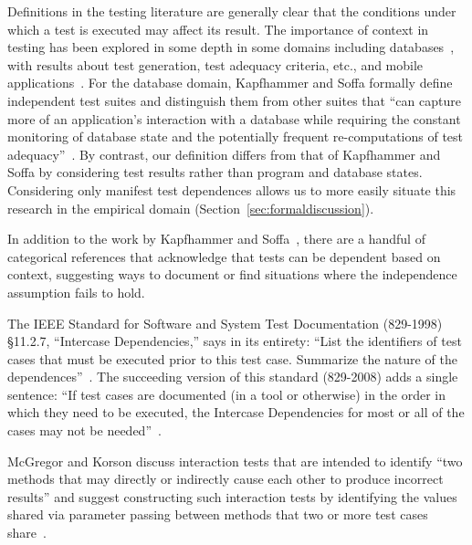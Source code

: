 Definitions in the testing literature are generally clear that the
conditions under which a test is executed may affect its result.  The
importance of context in testing has been explored in some depth in
some domains including databases~\cite{Gray:1994:QGB:191843.191886,Chays:2000:FTD:347324.348954,
kapfhammeretal:FSE:2003}, with results about test
generation, test adequacy criteria, etc., and mobile
applications~\cite{Wang:2007:AGC}.
For the database domain, Kapfhammer and Soffa formally
define independent test suites and distinguish them from
other suites that ``can capture more of an application's
interaction with a database while requiring the constant monitoring of
database state and the potentially frequent re-computations of test
adequacy''~\cite[p.~101]{kapfhammeretal:FSE:2003}.
By contrast, our definition differs from that of Kapfhammer
and Soffa by considering
test results rather than program and database states.
Considering only manifest test dependences allows
us to more easily situate this research in the empirical domain (Section~\ref{sec:formaldiscussion}).


In addition to the work by Kapfhammer and
Soffa~\cite{kapfhammeretal:FSE:2003},
there are a handful of categorical references that
acknowledge that tests can
be dependent based on context, suggesting 
ways to document or find situations where the independence
assumption fails to hold.  

The IEEE Standard for Software and System Test
Documentation (829-1998) \S 11.2.7, ``Intercase
Dependencies,'' says in its entirety: ``List the identifiers of
test cases that must be executed prior to this test
case. Summarize
the nature of the dependences''~\cite{IEEE:829-1998}.  The succeeding version of this
standard (829-2008) adds a single sentence: ``If
test cases are documented (in a tool or otherwise) in the order in
which they need to be executed, the Intercase Dependencies for most or
all of the cases may not be needed''~\cite{IEEE:829-2008}.

McGregor and Korson discuss interaction tests that
are intended to identify ``two methods that may directly or indirectly
cause each other to produce incorrect results'' and suggest constructing such
interaction tests by identifying the values shared via parameter passing
between methods
 that two or more test cases share~\cite[p~.69]{mcgregoretal:CACM:1994}.

